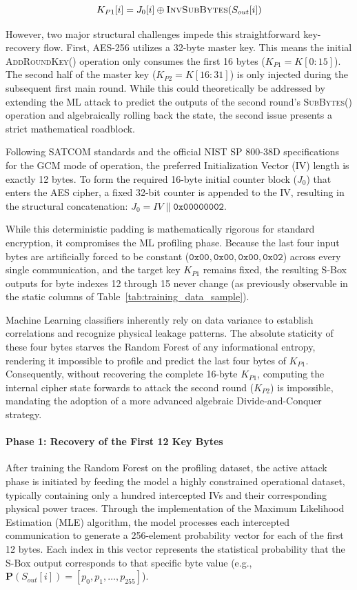 \documentclass[11pt,a4paper]{report}
\begin{document}
\begin{equation}
    K_{P1}[i] = J_0[i] \oplus \textsc{InvSubBytes}(S_{out}[i])
\end{equation}

However, two major structural challenges impede this straightforward key-recovery flow. 
First, AES-256 utilizes a 32-byte master key. This means the initial \textsc{AddRoundKey()} operation only consumes the first 16 bytes ($K_{P1} = K[0:15]$). 
The second half of the master key ($K_{P2} = K[16:31]$) is only injected during the subsequent first main round. 
While this could theoretically be addressed by extending the ML attack to predict the outputs of the second round's \textsc{SubBytes}() operation and algebraically rolling back the state, the second issue presents a strict mathematical roadblock.

Following SATCOM standards and the official NIST SP 800-38D specifications~\cite{GCM} for the GCM mode of operation, 
the preferred Initialization Vector (IV) length is exactly 12 bytes. 
To form the required 16-byte initial counter block ($J_0$) that enters the AES cipher, a fixed 32-bit counter is appended to the IV, 
resulting in the structural concatenation: $J_0 = \mathit{IV} \parallel \mathtt{0x00000002}$. 

While this deterministic padding is mathematically rigorous for standard encryption, it compromises the ML profiling phase. 
Because the last four input bytes are artificially forced to be constant ($\mathtt{0x00, 0x00, 0x00, 0x02}$) across every single communication, and the target key $K_{P1}$ remains fixed, the resulting S-Box outputs for byte indexes 12 through 15 never change (as previously observable in the static columns of Table~\ref{tab:training_data_sample}). 

Machine Learning classifiers inherently rely on data variance to establish correlations and recognize physical leakage patterns. 
The absolute staticity of these four bytes starves the Random Forest of any informational entropy, rendering it impossible to profile and predict the last four bytes of $K_{P1}$. 
Consequently, without recovering the complete 16-byte $K_{P1}$, computing the internal cipher state forwards to attack the second round ($K_{P2}$) is impossible, mandating the adoption of a more advanced algebraic Divide-and-Conquer strategy.

\paragraph{Phase 1: Recovery of the First 12 Key Bytes}
After training the Random Forest on the profiling dataset, the active attack phase is initiated by feeding the model a highly constrained operational dataset, 
typically containing only a hundred intercepted IVs and their corresponding physical power traces. 
Through the implementation of the Maximum Likelihood Estimation (MLE) algorithm, the model processes each intercepted communication to generate a 256-element probability vector for each of the first 12 bytes. 
Each index in this vector represents the statistical probability that the S-Box output corresponds to that specific byte value (e.g., $\mathbf{P}(S_{out}[i]) = [p_0, p_1, \dots, p_{255}]$).
\end{document}
